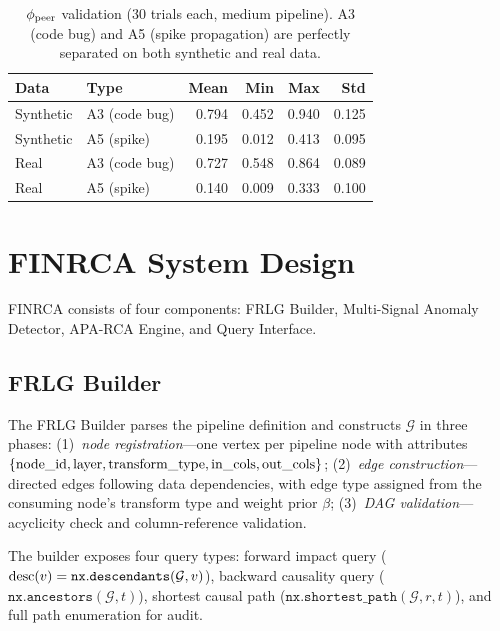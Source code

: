 \documentclass{article}
\newcommand{\finrca}{\textsc{FINRCA}}
\newcommand{\aparca}{\textsc{APA-RCA}}
\begin{document}
\begin{table}[h]
  \centering
  \caption{$\phi_{\rm peer}$ validation (30 trials each, medium pipeline).
           A3 (code bug) and A5 (spike propagation) are perfectly separated
           on both synthetic and real data.}
  \label{tab:phi_validation}
  \small
  \begin{tabular}{llrrrr}
    \toprule
    Data & Type & Mean & Min & Max & Std \\
    \midrule
    Synthetic & A3 (code bug) & 0.794 & 0.452 & 0.940 & 0.125 \\
    Synthetic & A5 (spike)    & 0.195 & 0.012 & 0.413 & 0.095 \\
    \midrule
    Real      & A3 (code bug) & 0.727 & 0.548 & 0.864 & 0.089 \\
    Real      & A5 (spike)    & 0.140 & 0.009 & 0.333 & 0.100 \\
    \bottomrule
  \end{tabular}
\end{table}

\section{FINRCA System Design}
\label{sec:system}

\finrca{} consists of four components: FRLG Builder, Multi-Signal Anomaly
Detector, \aparca{} Engine, and Query Interface.

\subsection{FRLG Builder}

The FRLG Builder parses the pipeline definition and constructs $\mathcal{G}$
in three phases: (1)~\emph{node registration}---one vertex per pipeline node
with attributes $\{{\rm node\_id}, {\rm layer}, {\rm transform\_type},
{\rm in\_cols}, {\rm out\_cols}\}$; (2)~\emph{edge construction}---directed
edges following data dependencies, with edge type assigned from the consuming
node's transform type and weight prior $\beta$; (3)~\emph{DAG validation}---
acyclicity check and column-reference validation.

The builder exposes four query types: forward impact query
(${\rm desc}(v) = \mathtt{nx.descendants}(\mathcal{G}, v)$), backward
causality query ($\mathtt{nx.ancestors}(\mathcal{G}, t)$), shortest causal
path ($\mathtt{nx.shortest\_path}(\mathcal{G}, r, t)$), and full path
enumeration for audit.
\end{document}
